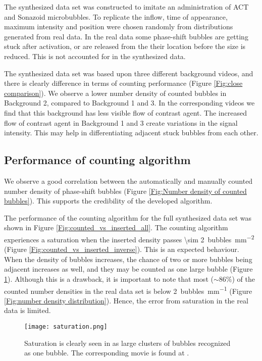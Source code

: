 The synthesized data set was constructed to imitate an administration of ACT\texttrademark{} and Sonazoid\texttrademark{} microbubbles. To replicate the inflow, time of appearance, maximum intensity and position were chosen randomly from distributions generated from real data. In the real data some phase-shift bubbles are getting stuck after activation, or are released from the their location before the size is reduced. This is not accounted for in the synthesized data. 

The synthesized data set was based upon three different background videos, and there is clearly difference in terms of counting performance (Figure \ref{Fig:close comparison}). We observe a lower number density of counted bubbles in Background 2, compared to Background 1 and 3. In the corresponding videos we find that this background has less visible flow of contrast agent. The increased flow of contrast agent in Background 1 and 3 create variations in the signal intensity. This may help in differentiating adjacent stuck bubbles from each other. 

\subsection{Performance of counting algorithm}

We observe a good correlation between the automatically and manually counted number density of phase-shift bubbles (Figure \ref{Fig:Number density of counted bubbles}). This supports the credibility of the developed algorithm.

The performance of the counting algorithm for the full synthesized data set was shown in Figure \ref{Fig:counted_vs_inserted_all}. The counting algorithm experiences a saturation when the inserted density passes \SI{\sim 2}{bubbles\per\milli\meter\squared} (Figure \ref{Fig:counted_vs_inserted_inverse}). This is an expected behaviour. When the density of bubbles increases, the chance of two or more bubbles being adjacent increases as well, and they may be counted as one large bubble (Figure \ref{Fig:saturation}). Although this is a drawback, it is important to note that most ($\sim 86\%$) of the counted number densities in the real data set is below \SI{2}{bubbles\per\milli\meter} (Figure \ref{Fig:number density distribution}). Hence, the error from saturation in the real data is limited.


\begin{figure}[h]
	\centering
	\texttt{[image: saturation.png]}
	 \cprotect\caption{Saturation is clearly seen in as large clusters of bubbles recognized as one bubble. The corresponding movie is found at  .}
	\label{Fig:saturation}
\end{figure}

